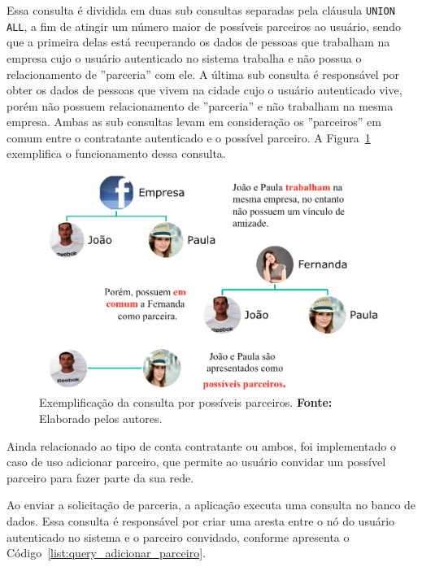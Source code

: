 \par Essa consulta é dividida em duas sub consultas separadas pela cláusula \texttt{UNION ALL}, a fim de atingir um número maior de possíveis parceiros ao usuário, sendo que a primeira delas está recuperando os dados de pessoas que trabalham na empresa cujo o usuário autenticado no sistema trabalha e não possua o relacionamento de ''parceria'' com ele. A última sub consulta é responsável por obter os dados de pessoas que vivem na cidade cujo o usuário autenticado vive, porém não possuem relacionamento de ''parceria'' e não trabalham na mesma empresa. Ambas as sub consultas levam em consideração os ''parceiros'' em comum entre o contratante autenticado e o possível parceiro. A Figura~\ref{fig:exemplo_funcionamento_possivel_parceiro} exemplifica o funcionamento dessa consulta.

\begin{figure}[h!]
	\centerline{\includegraphics[scale=0.4]{./imagens/exemplo-funcionamento-consulta-possiveis-parceiros.png}}
	\caption[Exemplificação da consulta por possíveis parceiros.]
	{Exemplificação da consulta por possíveis parceiros. \textbf{Fonte:} Elaborado pelos autores.}
	\label{fig:exemplo_funcionamento_possivel_parceiro}
\end{figure}


\par Ainda relacionado ao tipo de conta contratante ou ambos, foi implementado o caso de uso adicionar parceiro, que permite ao usuário convidar um possível parceiro para fazer parte da sua rede.

\par Ao enviar a solicitação de parceria, a aplicação executa uma consulta no banco de dados. Essa consulta é responsável por criar uma aresta entre o nó do usuário autenticado no sistema e o parceiro convidado, conforme apresenta o Código~\ref{list:query_adicionar_parceiro}.

